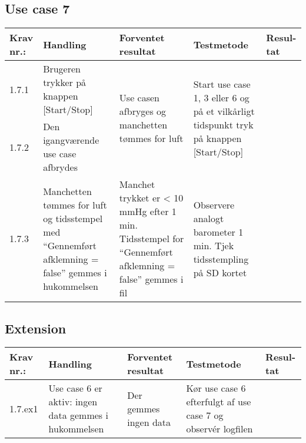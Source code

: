 \documentclass[11pt]{article}
\begin{document}
					
					\subsection{Use case 7}
					\begin{center}
						\begin{longtable}{|p{1.5cm}|p{2cm}|p{3cm}|p{3cm}|p{1.1cm}|}
							\hline
							Krav nr.: & Handling & Forventet resultat & Testmetode & Resul-tat  \\\hline
							1.7.1 & Brugeren trykker på knappen [Start/Stop] & \multirow{2}{3cm}{Use casen afbryges og manchetten tømmes for luft} & \multirow{2}{3cm}{Start use case 1, 3 eller 6 og på et vilkårligt tidspunkt tryk på knappen [Start/Stop]} & \multirow{2}{3cm}{} \\ \cline{1-2}
							1.7.2 & Den igangværende use case afbrydes & & & \\ \hline
							1.7.3 & Manchetten tømmes for luft og tidsstempel med “Gennemført afklemning = false” gemmes i hukommelsen & Manchet trykket er < 10 mmHg efter 1 min. Tidsstempel for  “Gennemført afklemning = false” gemmes i fil & Observere analogt barometer 1 min.
							Tjek tidsstempling på SD kortet & \\ \hline
						\end{longtable}
					\end{center}
					
					\subsection*{Extension}
					\begin{center}
						\begin{longtable}{|p{1.5cm}|p{2cm}|p{3cm}|p{3cm}|p{1.1cm}|}
							\hline
							Krav nr.: & Handling & Forventet resultat & Testmetode & Resul-tat  \\\hline
							1.7.ex1 & Use case 6 er aktiv: ingen data gemmes i hukommelsen & Der gemmes ingen data & Kør use case 6 efterfulgt af use case 7 og observér logfilen & \\ \hline
						\end{longtable}
					\end{center}
					
\end{document}
